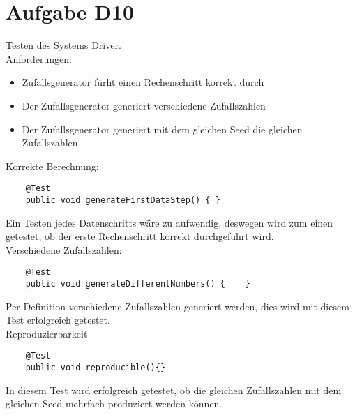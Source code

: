 
\chapter{Aufgabe D10}
Testen des Systems Driver.\\
Anforderungen:
\begin{itemize}
	\item Zufallsgenerator fürht einen Rechenschritt korrekt durch
	\item Der Zufallsgenerator generiert verschiedene Zufallszahlen
	\item Der Zufallsgenerator generiert mit dem gleichen Seed die gleichen Zufallszahlen
\end{itemize}

Korrekte Berechnung:
\begin{lstlisting}
    @Test
    public void generateFirstDataStep() { }
 \end{lstlisting}
 Ein Testen jedes Datenschritts wäre zu aufwendig, deswegen wird zum einen getestet, ob der erste Rechenschritt korrekt durchgeführt wird.\\
 
 Verschiedene Zufallszahlen:
\begin{lstlisting}
    @Test
    public void generateDifferentNumbers() {    }
\end{lstlisting}
Per Definition verschiedene Zufallszahlen generiert werden, dies wird mit diesem Test erfolgreich getestet.\\
    
Reproduzierbarkeit
\begin{lstlisting}
    @Test
    public void reproducible(){}
\end{lstlisting}
In diesem Test wird erfolgreich getestet, ob die gleichen Zufallszahlen mit dem gleichen Seed mehrfach produziert werden können.
